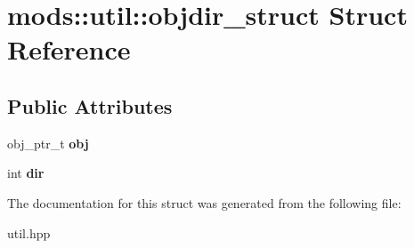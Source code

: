 \hypertarget{structmods_1_1util_1_1objdir__struct}{}\section{mods\+:\+:util\+:\+:objdir\+\_\+struct Struct Reference}
\label{structmods_1_1util_1_1objdir__struct}
\subsection*{Public Attributes}
\begin{DoxyCompactItemize}
\item 
\mbox{\label{structmods_1_1util_1_1objdir__struct_a2e4eba8bd7af0f95907ada07fdc35e59}} 
obj\+\_\+ptr\+\_\+t {\bfseries obj}
\item 
\mbox{\label{structmods_1_1util_1_1objdir__struct_abd58e394754382942675cb13732129eb}} 
int {\bfseries dir}
\end{DoxyCompactItemize}


The documentation for this struct was generated from the following file\+:\begin{DoxyCompactItemize}
\item 
util.\+hpp\end{DoxyCompactItemize}
